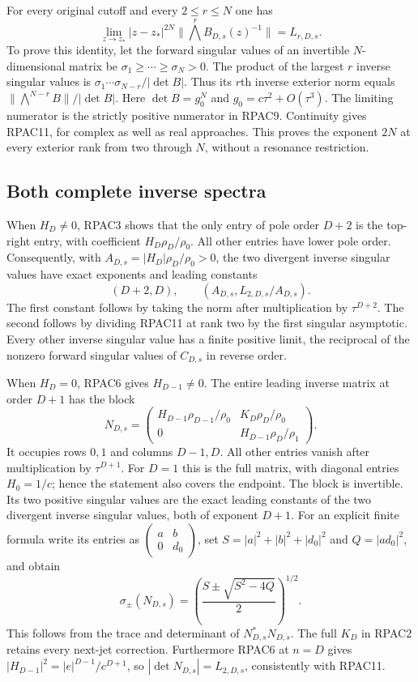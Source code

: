 \documentclass[11pt]{article}
\begin{document}
For every original cutoff and every $2\le r\le N$ one has
\[
 \lim_{z\to z_*}|z-z_*|^{2N}
       \|\bigwedge^rB_{D,s}(z)^{-1}\|=L_{r,D,s}.
 \tag{RPAC11}
\]
To prove this identity, let the forward singular values of an
invertible $N$-dimensional matrix be
$\sigma_1\ge\cdots\ge\sigma_N>0$. The product of the largest
$r$ inverse singular values is
$\sigma_1\cdots\sigma_{N-r}/|\det B|$.
Thus its $r$th inverse exterior norm equals
$\|\bigwedge^{N-r}B\|/|\det B|$.
Here $\det B=g_0^N$ and $g_0=c\tau^2+O(\tau^3)$.
The limiting numerator is the strictly positive numerator in
RPAC9. Continuity gives RPAC11, for complex as well as real
approaches. This proves the exponent $2N$ at every exterior rank
from two through $N$, without a resonance restriction.

\subsection{Both complete inverse spectra}
When $H_D\ne0$, RPAC3 shows that the only entry of pole order
$D+2$ is the top-right entry, with coefficient
$H_D\rho_D/\rho_0$. All other entries have lower pole order.
Consequently, with
$A_{D,s}=|H_D|\rho_D/\rho_0>0$, the two divergent inverse
singular values have exact exponents and leading constants
\[
 (D+2,D),\qquad (A_{D,s},L_{2,D,s}/A_{D,s}).\tag{RPAC12}
\]
The first constant follows by taking the norm after multiplication
by $\tau^{D+2}$. The second follows by dividing RPAC11 at rank
two by the first singular asymptotic. Every other inverse singular
value has a finite positive limit, the reciprocal of the nonzero
forward singular values of $C_{D,s}$ in reverse order.

When $H_D=0$, RPAC6 gives $H_{D-1}\ne0$. The entire leading
inverse matrix at order $D+1$ has the block
\[
 N_{D,s}=\begin{pmatrix}
 H_{D-1}\rho_{D-1}/\rho_0&K_D\rho_D/\rho_0\\
 0&H_{D-1}\rho_D/\rho_1
 \end{pmatrix}.\tag{RPAC13}
\]
It occupies rows $0,1$ and columns $D-1,D$.
All other entries vanish after multiplication by $\tau^{D+1}$.
For $D=1$ this is the full matrix, with diagonal entries
$H_0=1/c$; hence the statement also covers the endpoint.
The block is invertible. Its two positive singular values are
the exact leading constants of the two divergent inverse
singular values, both of exponent $D+1$.
For an explicit finite formula write its entries as
$\left(\begin{smallmatrix}a&b\\0&d_0\end{smallmatrix}\right)$,
set $S=|a|^2+|b|^2+|d_0|^2$ and $Q=|ad_0|^2$, and obtain
\[
 \sigma_\pm(N_{D,s})=
   \left(\frac{S\pm\sqrt{S^2-4Q}}2\right)^{1/2}.
 \tag{RPAC14}
\]
This follows from the trace and determinant of $N_{D,s}^*N_{D,s}$.
The full $K_D$ in RPAC2 retains every next-jet correction.
Furthermore RPAC6 at $n=D$ gives
$|H_{D-1}|^2=|e|^{D-1}/c^{D+1}$, so
$|\det N_{D,s}|=L_{2,D,s}$, consistently with RPAC11.
\end{document}
